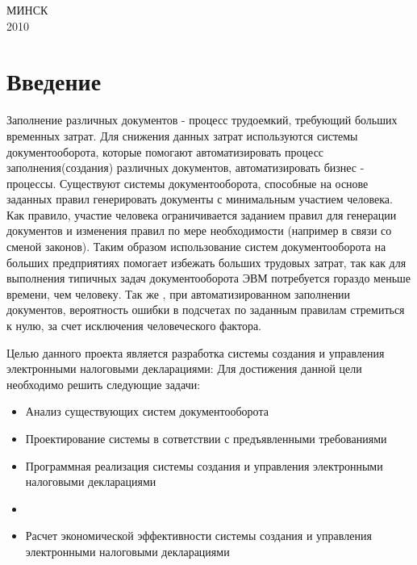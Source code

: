 \documentclass[14pt,a4paper]{reportmod}
\begin{document}
\begin{titlepage}
\vspace{1cm}

\begin{center}
МИНСК\\[10pt]
2010
\end{center}

\end{titlepage}

\linespread{1.05}
\setcounter{page}{4}
\thispagestyle{empty}
\tableofcontents

\chapter*{Введение}
Заполнение различных документов - процесс трудоемкий, требующий больших временных затрат. Для снижения данных затрат используются системы документооборота, которые помогают автоматизировать процесс заполнения(создания) различных документов, автоматизировать бизнес - процессы. Существуют системы документооборота, способные на основе заданных правил генерировать документы с минимальным участием человека. Как правило, участие человека ограничивается заданием правил для генерации документов и изменения правил по мере необходимости (например в связи со сменой законов). Таким образом использование систем документооборота на больших предприятиях помогает избежать больших трудовых затрат, так как для выполнения типичных задач документооборота ЭВМ потребуется гораздо меньше времени, чем человеку. Так же , при автоматизированном заполнении документов, вероятность ошибки в подсчетах по заданным правилам стремиться к нулю, за счет исключения человеческого фактора.


Целью данного проекта является разработка системы создания и управления электронными налоговыми декларациями: Для достижения данной цели необходимо решить следующие задачи:
\begin{itemize}
  \item Анализ существующих систем документооборота
  \item Проектирование системы в сответствии с предъявленными требованиями
  \item Программная реализация системы создания и управления электронными налоговыми декларациями
  \item
  \item Расчет экономической эффективности системы создания и управления электронными налоговыми декларациями
\end{itemize}
\end{document}
